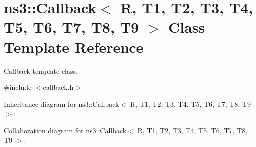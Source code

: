 \hypertarget{classns3_1_1Callback}{}\section{ns3\+:\+:Callback$<$ R, T1, T2, T3, T4, T5, T6, T7, T8, T9 $>$ Class Template Reference}
\label{classns3_1_1Callback}


\hyperlink{classns3_1_1Callback}{Callback} template class.  




{\ttfamily \#include $<$callback.\+h$>$}



Inheritance diagram for ns3\+:\+:Callback$<$ R, T1, T2, T3, T4, T5, T6, T7, T8, T9 $>$\+:


Collaboration diagram for ns3\+:\+:Callback$<$ R, T1, T2, T3, T4, T5, T6, T7, T8, T9 $>$\+:
